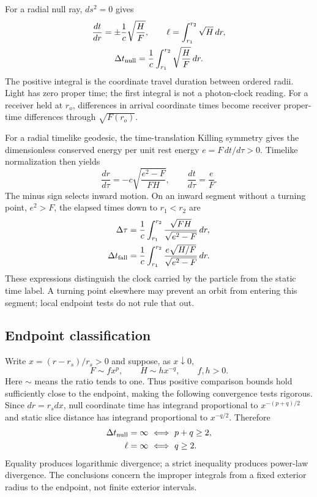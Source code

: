 \documentclass[10pt,twocolumn,letterpaper]{article}
\begin{document}
For a radial null ray, $ds^2=0$ gives
\begin{equation}
 \begin{gathered}
 \frac{dt}{dr}=\pm\frac1c\sqrt{\frac HF},\qquad \ell=\int_{r_1}^{r_2}\sqrt H\,dr,\\
 \Delta t_{\rm null}=\frac1c\int_{r_1}^{r_2}\sqrt{\frac HF}\,dr.
 \end{gathered}
 \label{eq:ch5-null-distance}
\end{equation}
The positive integral is the coordinate travel duration between ordered
radii. Light has zero proper time; the first integral is not a photon-clock
reading. For a receiver held at $r_o$, differences in arrival coordinate
times become receiver proper-time differences through $\sqrt{F(r_o)}$.

For a radial timelike geodesic, the time-translation Killing symmetry gives
the dimensionless conserved energy per unit rest energy
$e=F\,dt/d\tau>0$. Timelike normalization then yields
\begin{equation}
 \frac{dr}{d\tau}=-c\sqrt{\frac{e^2-F}{FH}},\qquad
 \frac{dt}{d\tau}=\frac eF.
 \label{eq:ch5-infall}
\end{equation}
The minus sign selects inward motion. On an inward segment without a
turning point, $e^2>F$, the elapsed times down to $r_1<r_2$ are
\begin{align}
 \Delta\tau&=\frac1c\int_{r_1}^{r_2}
     \frac{\sqrt{FH}}{\sqrt{e^2-F}}\,dr,\\
 \Delta t_{\rm fall}&=\frac1c\int_{r_1}^{r_2}
     \frac{e\sqrt{H/F}}{\sqrt{e^2-F}}\,dr.
 \label{eq:ch5-infall-times}
\end{align}
These expressions distinguish the clock carried by the particle from the
static time label. A turning point elsewhere may prevent an orbit from
entering this segment; local endpoint tests do not rule that out.

\subsection{Endpoint classification}
Write $x=(r-r_s)/r_s>0$ and suppose, as $x\downarrow0$,
\begin{equation}
 F\sim f x^p,\qquad H\sim h x^{-q},\qquad f,h>0.
 \label{eq:ch5-powers}
\end{equation}
Here $\sim$ means the ratio tends to one. Thus positive comparison bounds
hold sufficiently close to the endpoint, making the following convergence
tests rigorous. Since $dr=r_sdx$, null coordinate time has integrand
proportional to $x^{-(p+q)/2}$ and static slice distance has integrand
proportional to $x^{-q/2}$. Therefore
\begin{align}
 \Delta t_{\rm null}=\infty&\ \Longleftrightarrow\ p+q\geq2,\\
 \ell=\infty&\ \Longleftrightarrow\ q\geq2.
 \label{eq:ch5-null-criteria}
\end{align}
Equality produces logarithmic divergence; a strict inequality produces
power-law divergence. The conclusions concern the improper integrals
from a fixed exterior radius to the endpoint, not finite exterior intervals.
\end{document}
